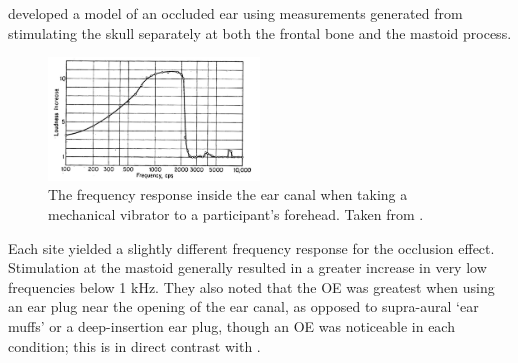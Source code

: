 \documentclass[dissertation,copyright]{uathesis}
\begin{document}
\cite{stenfelt:07} developed a model of an occluded ear using measurements generated from stimulating the skull separately at both the frontal bone and the mastoid process.
%
\begin{figure}
\includegraphics[width=0.5\textwidth]{figure/bekesy60-1.png}
\caption{The frequency response inside the ear canal when taking a mechanical vibrator to a participant's forehead.  Taken from \cite{bekesy:60}.}
\label{fig:bekesyOEresponse}
\end{figure}
%
Each site yielded a slightly different frequency response for the occlusion effect.  Stimulation at the mastoid generally resulted in a greater increase in very low frequencies below 1 kHz.  They also noted that the OE was greatest when using an ear plug near the opening of the ear canal, as opposed to supra-aural `ear muffs' or a deep-insertion ear plug, though an OE was noticeable in each condition; this is in direct contrast with \cite{dean:00}.   
%
\end{document}
